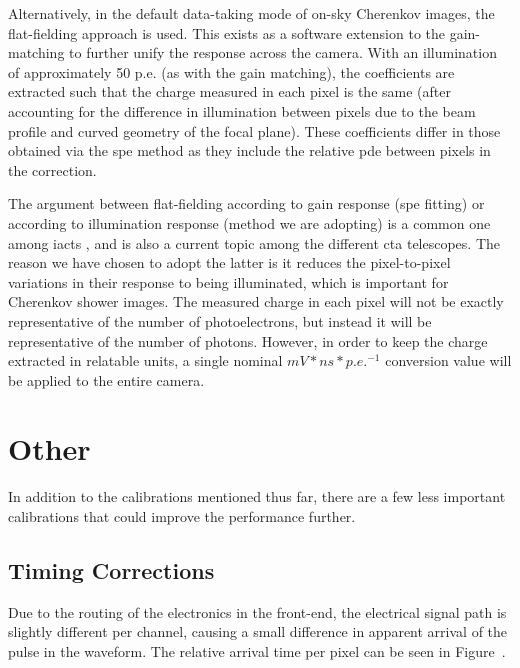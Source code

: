 Alternatively, in the default data-taking mode of on-sky Cherenkov images, the flat-fielding approach is used. This exists as a software extension to the gain-matching to further unify the response across the camera. With an illumination of approximately 50 p.e. (as with the gain matching), the coefficients are extracted such that the charge measured in each pixel is the same (after accounting for the difference in illumination between pixels due to the beam profile and curved geometry of the focal plane). These coefficients differ in those obtained via the \gls{spe} method as they include the relative \gls{pde} between pixels in the correction. 

The argument between flat-fielding according to gain response (\gls{spe} fitting) or according to illumination response (method we are adopting) is a common one among \glspl{iact} , and is also a current topic among the different \gls{cta} telescopes. The reason we have chosen to adopt the latter is it reduces the pixel-to-pixel variations in their response to being illuminated, which is important for Cherenkov shower images. The measured charge in each pixel will not be exactly representative of the number of photoelectrons, but instead it will be representative of the number of photons. However, in order to keep the charge extracted in relatable units, a single nominal $mV*ns*p.e.^{-1}$ conversion value will be applied to the entire camera.


\section{Other}

In addition to the calibrations mentioned thus far, there are a few less important calibrations that could improve the performance further. 

\subsection{Timing Corrections}

Due to the routing of the electronics in the front-end, the electrical signal path is slightly different per channel, causing a small difference in apparent arrival of the pulse in the waveform. The relative arrival time per pixel can be seen in Figure~. 

